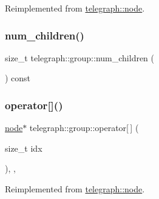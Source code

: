 Reimplemented from \hyperlink{classtelegraph_1_1node_a9d19888a9a73a4623dcab55be6386395}{telegraph\+::node}.

\mbox{\label{classtelegraph_1_1group_a75e3d657ee7458aeedfcc353bd50e571}} 
\subsubsection{\texorpdfstring{num\+\_\+children()}{num\_children()}}
{\footnotesize\ttfamily size\+\_\+t telegraph\+::group\+::num\+\_\+children (\begin{DoxyParamCaption}{ }\end{DoxyParamCaption}) const\hspace{0.3cm}{\ttfamily [inline]}}

\mbox{\label{classtelegraph_1_1group_aaf32eea781de1f18d37765793589dda5}} 
\subsubsection{\texorpdfstring{operator[]()}{operator[]()}\hspace{0.1cm}{\footnotesize\ttfamily [1/4]}}
{\footnotesize\ttfamily \hyperlink{classtelegraph_1_1node}{node}$\ast$ telegraph\+::group\+::operator\mbox{[}$\,$\mbox{]} (\begin{DoxyParamCaption}\item[{size\+\_\+t}]{idx }\end{DoxyParamCaption})\hspace{0.3cm}{\ttfamily [inline]}, {\ttfamily [override]}, {\ttfamily [virtual]}}



Reimplemented from \hyperlink{classtelegraph_1_1node_ad82c9a9af7b7cf132db1c1e74f09254f}{telegraph\+::node}.

\mbox{\label{classtelegraph_1_1group_a1b084997076f624d3814b057b26162cd}} 
